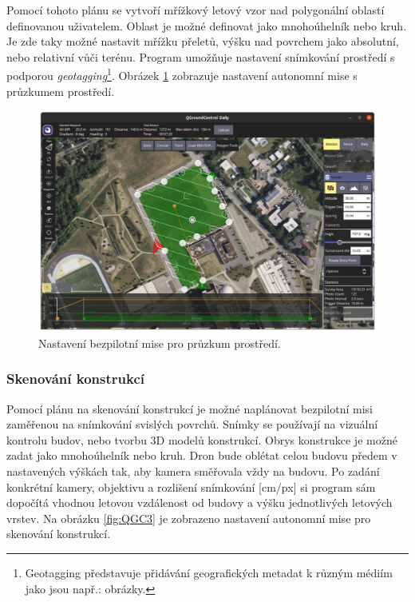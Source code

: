 Pomocí tohoto plánu se vytvoří mřížkový letový vzor nad polygonální oblastí definovanou uživatelem. Oblast je možné definovat jako mnohoúhelník nebo kruh. Je zde taky možné nastavit mřížku přeletů, výšku nad povrchem jako absolutní, nebo relativní vůči terénu. Program umožňuje nastavení snímkování prostředí s podporou \textit{geotagging}\footnote{Geotagging představuje přidávání geografických metadat k různým médiím jako jsou např.: obrázky.}. Obrázek \ref{fig:QGC2} zobrazuje nastavení autonomní mise s průzkumem prostředí.

\begin{figure}[!ht]
    \begin{center}
        \includegraphics[scale=0.34]{obrazky/QGC3}
    \end{center}
    \caption[Nastavení bezpilotní mise pro průzkum prostředí]{Nastavení bezpilotní mise pro průzkum prostředí.}
    \label{fig:QGC2}
\end{figure}

\subsubsection{Skenování konstrukcí}

Pomocí plánu na skenování konstrukcí je možné naplánovat bezpilotní misi zaměřenou na snímkování svislých povrchů. Snímky se používají na vizuální kontrolu budov, nebo tvorbu 3D modelů konstrukcí. Obrys konstrukce je možné zadat jako mnohoúhelník nebo kruh. Dron bude oblétat celou budovu předem v nastavených výškách tak, aby kamera směřovala vždy na budovu. Po zadání konkrétní kamery, objektivu a rozlišení snímkování [cm/px] si program sám dopočítá vhodnou letovou vzdálenost od budovy a výšku jednotlivých letových vrstev. Na obrázku \ref{fig:QGC3} je zobrazeno nastavení autonomní mise pro skenování konstrukcí.

